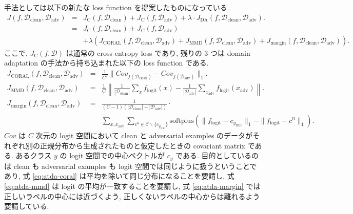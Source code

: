 手法としては以下の新たな loss function を提案したものになっている.
%
\begin{eqnarray}
J(f, \mathcal{D}_{\text{clean}}, \mathcal{D}_{\text{adv}}) &=& J_{\text{C}} (f, \mathcal{D}_{\text{clean}}) + J_{\text{C}} (f, \mathcal{D}_{\text{adv}}) + \lambda \cdot J_{\text{DA}} (f, \mathcal{D}_{\text{clean}}, \mathcal{D}_{\text{adv}}). \\
&=& J_{\text{C}} (f, \mathcal{D}_{\text{clean}}) + J_{\text{C}} (f, \mathcal{D}_{\text{adv}}) \nonumber \\
&&+ \lambda ( J_{\text{CORAL}} (f, \mathcal{D}_{\text{clean}}, \mathcal{D}_{\text{adv}}) + J_{\text{MMD}} (f, \mathcal{D}_{\text{clean}}, \mathcal{D}_{\text{adv}}) + J_{\text{margin}} (f, \mathcal{D}_{\text{clean}}, \mathcal{D}_{\text{adv}}) ). \nonumber
\label{eq:atda-loss}
\end{eqnarray}
%
ここで, $J_{\text{C}} (f, \mathcal{D})$ は通常の cross entropy loss であり, 残りの 3 つは domain adaptation の手法から持ち込まれた以下の loss function である.
%
\begin{eqnarray}
J_{\text{CORAL}} (f, \mathcal{D}_{\text{clean}}, \mathcal{D}_{\text{adv}}) &=& \frac{1}{C^2} \| Cov_{f(\mathcal{D}_{\text{clean}})} - Cov_{f(\mathcal{D}_{\text{adv}})} \|_1.
\label{eq:atda-coral} \\
J_{\text{MMD}} (f, \mathcal{D}_{\text{clean}}, \mathcal{D}_{\text{adv}}) &=& \frac{1}{C} \left\| \frac{1}{| \mathcal{D}_{\text{clean}}|} \sum_{x} f_{\text{logit}} (x) - \frac{1}{|\mathcal{D}_{\text{adv}}|} \sum_{x_{\text{adv}}} f_{\text{logit}} (x_{\text{adv}}) \right\|.
\label{eq:atda-mmd} \\
J_{\text{margin}} (f, \mathcal{D}_{\text{clean}}, \mathcal{D}_{\text{adv}}) &=& \frac{1}{(C - 1) (| \mathcal{D}_{\text{clean}}| + | \mathcal{D}_{\text{adv}}|)} \cdot \nonumber \\
&& \sum_{x, x_{\text{adv}}} \sum_{c^n \in \mathcal{C} \backslash \{c_{y_{\text{true}}}\}} \text{softplus} (\|f_{\text{logit}} - c_{y_{\text{true}}}\|_1 - \|f_{\text{logit}} - c^n\|_1).
\label{eq:atda-margin}
\end{eqnarray}
%
$Cov$ は $C$ 次元の logit 空間において clean と adversarial examples のデータがそれぞれ別の正規分布から生成されたものと仮定したときの covariant matrix である.
あるクラス $y$ の logit 空間での中心ベクトルが $c_y$ である.
目的としているのは clean も adversarial examples も logit 空間では同じように扱うということであり, 式 \ref{eq:atda-coral} は平均を除いて同じ分布になることを要請し, 式 \ref{eq:atda-mmd} は logit の平均が一致することを要請し, 式 \ref{eq:atda-margin} では正しいラベルの中心には近づくよう, 正しくないラベルの中心からは離れるよう要請している.
